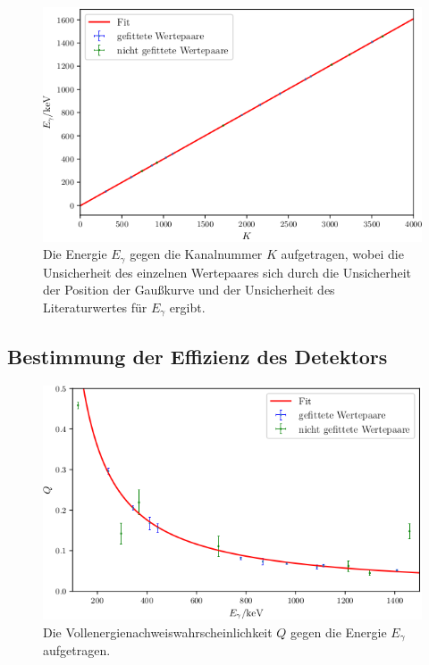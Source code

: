 \begin{figure}
	\centering
	\includegraphics[width=\linewidth-70pt,height=\textheight-70pt,keepaspectratio]{content/images/EnergieKali.png}
	\caption{Die Energie $E_\gamma$ gegen die Kanalnummer $K$ aufgetragen, wobei die Unsicherheit des einzelnen Wertepaares sich durch die Unsicherheit der Position der Gaußkurve und der Unsicherheit des Literaturwertes für $E_\gamma$ ergibt.}
	\label{fig:Kalibrierungi}
\end{figure}

\subsection{Bestimmung der Effizienz des Detektors}

\begin{figure}
	\centering
	\includegraphics[width=\linewidth-70pt,height=\textheight-70pt,keepaspectratio]{content/images/Q.png}
	\caption{Die Vollenergienachweiswahrscheinlichkeit $Q$ gegen die Energie $E_\gamma$ aufgetragen.}
	\label{fig:Q}
\end{figure}

